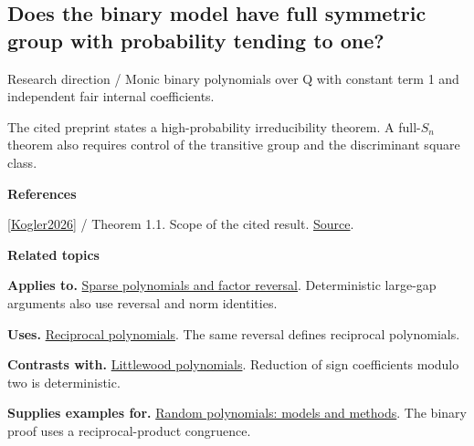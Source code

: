 \documentclass[11pt,a4paper,oneside,openany]{book}
\newenvironment{sources}{\par\smallskip\begingroup\footnotesize\color{atlasgray}\leftskip=10pt\setlength{\parskip}{2pt}}{\par\endgroup\smallskip}
\begin{document}
\subsection*{Does the binary model have full symmetric group with probability tending to one?}
{\small\sffamily\color{atlasgold}Research direction / Monic binary polynomials over Q with constant term 1 and independent fair internal coefficients.}\par\smallskip
\color{black} The cited preprint states a high-probability irreducibility theorem. A full-\(S_n\) theorem also requires control of the transitive group and the discriminant square class.\par
\begin{sources}
\textbf{References}\par\smallskip
\noindent\hyperlink{ref:Kogler2026}{[Kogler2026]} / Theorem 1.1. Scope of the cited result. \href{https://arxiv.org/abs/2609.26771v2}{Source}.\par
\end{sources}\color{black}
\par\medskip\begingroup\footnotesize\setlength{\parskip}{1pt}\textbf{\sffamily\color{atlasgreen}Related topics}\par
\color{black}\textbf{Applies to.} \hyperlink{article:sparse-gaps}{Sparse polynomials and factor reversal}. Deterministic large-gap arguments also use reversal and norm identities.\par
\color{black}\textbf{Uses.} \hyperlink{article:reciprocity}{Reciprocal polynomials}. The same reversal defines reciprocal polynomials.\par
\color{black}\textbf{Contrasts with.} \hyperlink{article:littlewood}{Littlewood polynomials}. Reduction of sign coefficients modulo two is deterministic.\par
\color{black}\textbf{Supplies examples for.} \hyperlink{article:random-models}{Random polynomials: models and methods}. The binary proof uses a reciprocal-product congruence.\par
\endgroup
\end{document}
